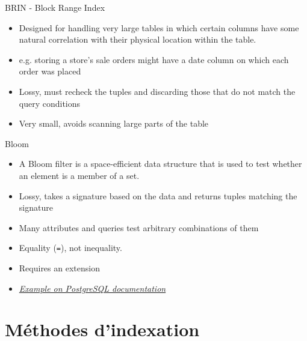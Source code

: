 \documentclass{beamer}
\begin{document}
\begin{frame}{BRIN - Block Range Index}
    \begin{itemize}
        \item Designed for handling very large tables in which certain columns have some natural correlation with their physical location within the table.
        \item e.g. storing a store's sale orders might have a date column on which each order was placed
        \item Lossy, must recheck the tuples and discarding those that do not match the query conditions
        \item Very small, avoids scanning large parts of the table
        \end{itemize}
\end{frame}

\begin{frame}{Bloom}
    \begin{itemize}
        \item A Bloom filter is a space-efficient data structure that is used to test whether an element is a member of a set.
        \item Lossy, takes a signature based on the data and returns tuples matching the signature
        \item Many attributes and queries test arbitrary combinations of them
        \item Equality (\texttt{=}), not inequality.
        \item Requires an extension
        \item \href{https://www.postgresql.org/docs/current/bloom.html\#BLOOM-EXAMPLES}{\textit{Example on PostgreSQL documentation}}
    \end{itemize}
\end{frame}

\section{Méthodes d'indexation}
\end{document}
